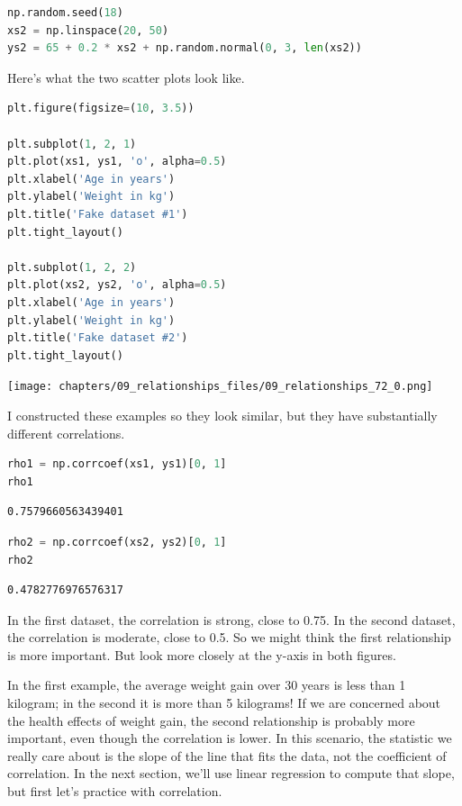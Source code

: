 \begin{lstlisting}[language=Python,style=source]
np.random.seed(18)
xs2 = np.linspace(20, 50)
ys2 = 65 + 0.2 * xs2 + np.random.normal(0, 3, len(xs2))
\end{lstlisting}

Here's what the two scatter plots look like.

\begin{lstlisting}[language=Python,style=source]
plt.figure(figsize=(10, 3.5))

plt.subplot(1, 2, 1)
plt.plot(xs1, ys1, 'o', alpha=0.5)
plt.xlabel('Age in years')
plt.ylabel('Weight in kg')
plt.title('Fake dataset #1')
plt.tight_layout()

plt.subplot(1, 2, 2)
plt.plot(xs2, ys2, 'o', alpha=0.5)
plt.xlabel('Age in years')
plt.ylabel('Weight in kg')
plt.title('Fake dataset #2')
plt.tight_layout()
\end{lstlisting}

\begin{center}
\texttt{[image: chapters/09\_relationships\_files/09\_relationships\_72\_0.png]}
\end{center}

I constructed these examples so they look similar, but they have
substantially different correlations.

\begin{lstlisting}[language=Python,style=source]
rho1 = np.corrcoef(xs1, ys1)[0, 1]
rho1
\end{lstlisting}

\begin{lstlisting}[style=output]
0.7579660563439401
\end{lstlisting}

\begin{lstlisting}[language=Python,style=source]
rho2 = np.corrcoef(xs2, ys2)[0, 1]
rho2
\end{lstlisting}

\begin{lstlisting}[style=output]
0.4782776976576317
\end{lstlisting}

In the first dataset, the correlation is strong, close to 0.75. In the
second dataset, the correlation is moderate, close to 0.5. So we might
think the first relationship is more important. But look more closely at
the y-axis in both figures.

In the first example, the average weight gain over 30 years is less than
1 kilogram; in the second it is more than 5 kilograms! If we are
concerned about the health effects of weight gain, the second
relationship is probably more important, even though the correlation is
lower. In this scenario, the statistic we really care about is the slope
of the line that fits the data, not the coefficient of correlation. In
the next section, we'll use linear regression to compute that slope, but
first let's practice with correlation.

